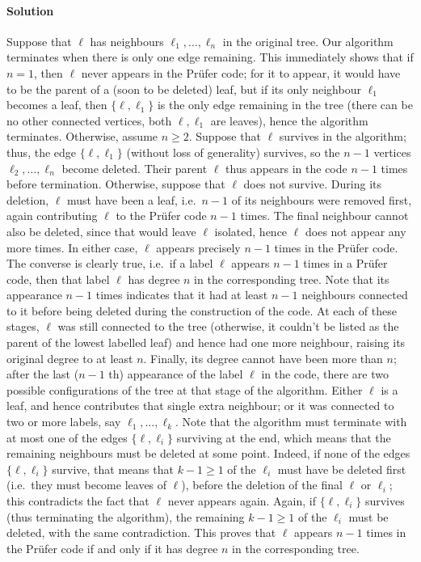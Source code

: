 \documentclass[10pt]{article}
\newcommand{\solution}{\paragraph{Solution}}
\begin{document}
    \solution Suppose that $\ell$ has neighbours $\ell_1, \dots, \ell_n$ in the
    original tree. Our algorithm terminates when there is only one edge remaining.
    This immediately shows that if $n = 1$, then $\ell$ never appears in the Pr\"ufer
    code; for it to appear, it would have to be the parent of a (soon to be deleted)
    leaf, but if its only neighbour $\ell_1$ becomes a leaf, then $\{\ell, \ell_1\}$
    is the only edge remaining in the tree (there can be no other connected vertices,
    both $\ell, \ell_1$ are leaves), hence the algorithm terminates. Otherwise,
    assume $n \geq 2$. Suppose that $\ell$ survives in the algorithm; thus, the edge
    $\{\ell, \ell_1\}$ (without loss of generality) survives, so the $n - 1$
    vertices $\ell_2, \dots, \ell_n$ become deleted. Their parent $\ell$ thus appears
    in the code $n - 1$ times before termination. Otherwise, suppose that $\ell$ does
    not survive. During its deletion, $\ell$ must have been a leaf, i.e.\ $n - 1$ of
    its neighbours were removed first, again contributing $\ell$ to the Pr\"ufer code
    $n - 1$ times. The final neighbour cannot also be deleted, since that would leave
    $\ell$ isolated, hence $\ell$ does not appear any more times. In either case,
    $\ell$ appears precisely $n - 1$ times in the Pr\"ufer code. \\


    The converse is clearly true, i.e.\ if a label $\ell$ appears $n - 1$ times in a
    Pr\"ufer code, then that label $\ell$ has degree $n$ in the corresponding tree.
    Note that its appearance $n - 1$ times indicates that it had at least $n - 1$
    neighbours connected to it before being deleted during the construction of the
    code. At each of these stages, $\ell$ was still connected to the tree (otherwise,
    it couldn't be listed as the parent of the lowest labelled leaf) and hence had
    one more neighbour, raising its original degree to at least $n$. Finally, its
    degree cannot have been more than $n$; after the last ($n - 1$ th) appearance of
    the label $\ell$ in the code, there are two possible configurations of the tree
    at that stage of the algorithm. Either $\ell$ is a leaf, and hence contributes
    that single extra neighbour; or it was connected to two or more labels, say
    $\ell_1, \dots, \ell_k$. Note that the algorithm must terminate with at most one
    of the edges $\{\ell, \ell_i\}$ surviving at the end, which means that the
    remaining neighbours must be deleted at some point. Indeed, if none of the edges
    $\{\ell, \ell_i\}$ survive, that means that $k - 1 \geq 1$ of the $\ell_i$ must
    have be deleted first (i.e.\ they must become leaves of $\ell$), before the
    deletion of the final $\ell$ or $\ell_i$; this contradicts the fact that $\ell$
    never appears again. Again, if $\{\ell, \ell_i\}$ survives (thus terminating the
    algorithm), the remaining $k - 1\geq 1$ of the $\ell_i$ must be deleted, with the
    same contradiction. This proves that $\ell$ appears $n - 1$ times in the Pr\"ufer
    code if and only if it has degree $n$ in the corresponding tree. \\
\end{document}
